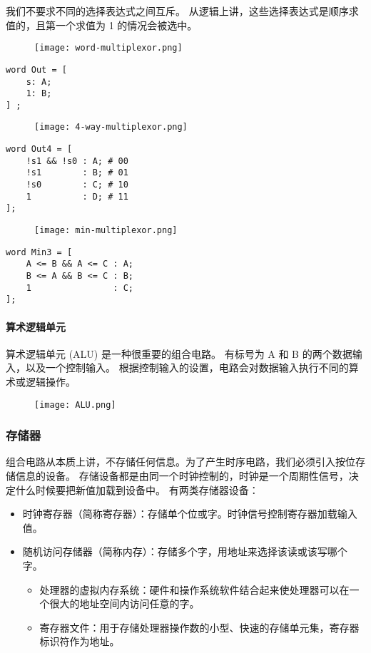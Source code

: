我们不要求不同的选择表达式之间互斥。
从逻辑上讲，这些选择表达式是顺序求值的，且第一个求值为 1 的情况会被选中。
\begin{figure}[H]
    \centering
    \texttt{[image: word-multiplexor.png]}
\end{figure}
\begin{lstlisting}[style=CStyle]
word Out = [
    s: A;
    1: B;
] ;
\end{lstlisting}
\begin{figure}[H]
    \centering
    \texttt{[image: 4-way-multiplexor.png]}
\end{figure}
\begin{lstlisting}[style=CStyle]
word Out4 = [
    !s1 && !s0 : A; # 00
    !s1        : B; # 01
    !s0        : C; # 10
    1          : D; # 11
];
\end{lstlisting}
\begin{figure}[H]
    \centering
    \texttt{[image: min-multiplexor.png]}
\end{figure}
\begin{lstlisting}[style=CStyle]
word Min3 = [
    A <= B && A <= C : A;
    B <= A && B <= C : B;
    1                : C;
];
\end{lstlisting}

\paragraph{算术逻辑单元}

算术逻辑单元 (ALU) 是一种很重要的组合电路。
有标号为 A 和 B 的两个数据输入，以及一个控制输入。
根据控制输入的设置，电路会对数据输入执行不同的算术或逻辑操作。

\begin{figure}[H]
    \centering
    \texttt{[image: ALU.png]}
\end{figure}


\subsubsection{存储器}
组合电路从本质上讲，不存储任何信息。为了产生时序电路，我们必须引入按位存储信息的设备。
存储设备都是由同一个时钟控制的，时钟是一个周期性信号，决定什么时候要把新值加载到设备中。
有两类存储器设备：
\begin{itemize}
    \item 时钟寄存器（简称寄存器）：存储单个位或字。时钟信号控制寄存器加载输入值。
    \item 随机访问存储器（简称内存）：存储多个字，用地址来选择该读或该写哪个字。
          \begin{itemize}
              \item 处理器的虚拟内存系统：硬件和操作系统软件结合起来使处理器可以在一个很大的地址空间内访问任意的字。
              \item 寄存器文件：用于存储处理器操作数的小型、快速的存储单元集，寄存器标识符作为地址。
          \end{itemize}
\end{itemize}

